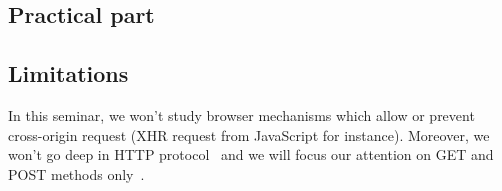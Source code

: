 \documentclass[a4paper,11pt]{article}
\begin{document}
  \subsection{Practical part}
  
  
  \subsection{Limitations}

  In this seminar, we won't study browser mechanisms which allow or prevent cross-origin 
  request (XHR request from JavaScript for instance). Moreover, we won't go deep in HTTP 
  protocol~\cite{rfc2616} and we will focus our attention on GET and POST methods only~\cite[5.1.1]{rfc2616}.
  


\end{document}
